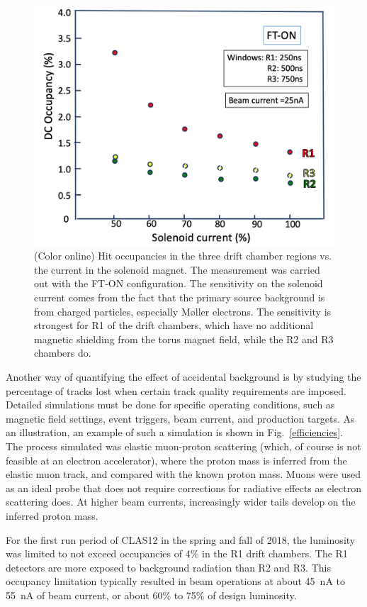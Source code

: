 \documentclass[final,3p,twocolumn]{elsarticle}
\begin{document}
\begin{figure}[t!]
\centerline{\includegraphics[width=1.0\columnwidth]{occupancy-solenoid.png}}
\caption{(Color online) Hit occupancies in the three drift chamber regions vs. the current in the solenoid magnet. The
  measurement was carried out with the FT-ON configuration. The sensitivity on the solenoid current comes from
  the fact that the primary source background is from charged particles, especially M{\o}ller electrons. The
  sensitivity is strongest for R1 of the drift chambers, which have no additional magnetic shielding from the torus
  magnet field, while the R2 and R3 chambers do.}
\label{occupancies2}
\end{figure}
Another way of quantifying the effect of accidental background is by studying the percentage of tracks lost when
certain track quality requirements are imposed. Detailed simulations must be done for specific operating conditions,
 such as magnetic field settings, event triggers, beam current, and production targets.  As an illustration, an example of such a simulation is shown in Fig.~\ref{efficiencies}. The process simulated 
was elastic muon-proton scattering (which, of course is not feasible at an electron accelerator), where the proton mass is inferred from the elastic muon track, and compared with the
known proton mass. Muons were used as an ideal probe that does not require corrections for radiative effects 
as electron scattering does. At higher beam currents, increasingly wider tails develop on the inferred proton mass. 

For the first run period of CLAS12 in the spring and fall of 2018, the luminosity was limited to not exceed occupancies of
4\% in the R1 drift chambers. The R1 detectors are more exposed to background radiation than R2 and R3. This
occupancy limitation typically resulted in beam operations at about 45~nA to 55~nA of beam current, or about
60\% to 75\% of design luminosity.
\end{document}

